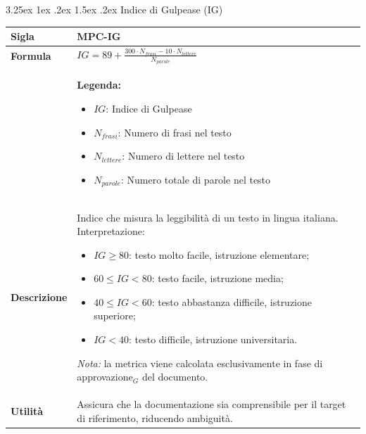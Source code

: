 \documentclass[a4paper, 10pt]{article}
\makeatletter
\renewcommand\paragraph{\@startsection{paragraph}{4}{\z@}%
  {3.25ex \@plus1ex \@minus .2ex}%
  {1.5ex \@plus .2ex}%
  {\normalfont\normalsize\bfseries}}
\makeatother
\begin{document}
\paragraph{Indice di Gulpease (IG)}
\mbox{} \\
\noindent
\begin{minipage}{\textwidth}
    \begin{tabularx}{\textwidth}{|>{\columncolor{bluBitless!10}\bfseries}p{3.5cm}|X|}
        \hline
        Sigla & MPC-IG \\ \hline
        Formula &  
        \textit{$IG = 89 + \frac{300 \cdot N_{frasi} - 10 \cdot N_{lettere}}{N_{parole}}$} \vspace{2mm} \\
        & \small \textbf{Legenda:}
        \begin{itemize}
            \item $IG$: Indice di Gulpease
            \item $N_{frasi}$: Numero di frasi nel testo
            \item $N_{lettere}$: Numero di lettere nel testo
            \item $N_{parole}$: Numero totale di parole nel testo
        \end{itemize} \\ \hline
        Descrizione & Indice che misura la leggibilità di un testo in lingua italiana. Interpretazione:
        \begin{itemize}
            \item $IG \ge 80$: testo molto facile, istruzione elementare;
            \item $60 \le IG < 80$: testo facile, istruzione media;
            \item $40 \le IG < 60$: testo abbastanza difficile, istruzione superiore;
            \item $IG < 40$: testo difficile, istruzione universitaria.
        \end{itemize}
        \textit{Nota:} la metrica viene calcolata esclusivamente in fase di approvazione$_G$ del documento. \\ \hline
        Utilità & Assicura che la documentazione sia comprensibile per il target di riferimento, riducendo ambiguità. \\ \hline
    \end{tabularx}
\end{minipage}

\vspace{1cm}
\end{document}
